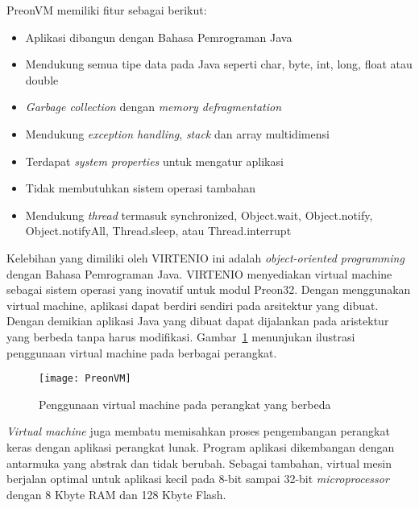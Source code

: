 PreonVM memiliki fitur sebagai berikut:
\begin{itemize}
	\item Aplikasi dibangun dengan Bahasa Pemrograman Java
	\item Mendukung semua tipe data pada Java seperti char, byte, int, long, float atau double
	\item \textit{Garbage collection} dengan \textit{memory defragmentation}
	\item Mendukung \textit{exception handling}, \textit{stack} dan array multidimensi
	\item Terdapat \textit{system properties} untuk mengatur aplikasi
	\item Tidak membutuhkan sistem operasi tambahan
	\item Mendukung \textit{thread} termasuk synchronized, Object.wait, Object.notify, Object.notifyAll, Thread.sleep, atau Thread.interrupt
\end{itemize}

Kelebihan yang dimiliki oleh VIRTENIO ini adalah \textit{object-oriented programming} dengan Bahasa Pemrograman Java. VIRTENIO menyediakan virtual machine sebagai sistem operasi yang inovatif untuk modul Preon32. Dengan menggunakan virtual machine, aplikasi dapat berdiri sendiri pada arsitektur yang dibuat. Dengan demikian aplikasi Java yang dibuat dapat dijalankan pada aristektur yang berbeda tanpa harus modifikasi. Gambar~\ref{fig:PreonVM} menunjukan ilustrasi penggunaan virtual machine pada berbagai perangkat. 

\begin{figure} [H]
	\centering  
	\texttt{[image: PreonVM]}  
	\caption[Penggunaan virtual machine pada perangkat yang berbeda]{Penggunaan virtual machine pada perangkat yang berbeda} 
	\label{fig:PreonVM} 
\end{figure} 

\textit{Virtual machine} juga membatu memisahkan proses pengembangan perangkat keras dengan aplikasi perangkat lunak. Program aplikasi dikembangan dengan antarmuka yang abstrak dan tidak berubah. Sebagai tambahan, virtual mesin berjalan optimal untuk aplikasi kecil pada 8-bit sampai 32-bit \textit{microprocessor} dengan 8 Kbyte RAM dan 128 Kbyte Flash.  

